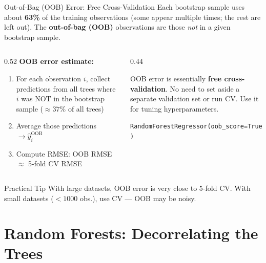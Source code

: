 \documentclass[aspectratio=169, 11pt]{beamer}
\begin{document}
\begin{frame}{Out-of-Bag (OOB) Error: Free Cross-Validation}
  Each bootstrap sample uses about \textbf{63\%} of the training observations
  (some appear multiple times; the rest are left out).
  The \textbf{out-of-bag (OOB)} observations are those \emph{not} in a given bootstrap sample.
  \begin{columns}[T]
    \begin{column}{0.52\textwidth}
      \textbf{OOB error estimate:}
      \begin{enumerate}\small
        \item For each observation $i$, collect predictions from
              all trees where $i$ was NOT in the bootstrap sample
              ($\approx 37\%$ of all trees)
        \item Average those predictions $\to \hat{y}_i^{\text{OOB}}$
        \item Compute RMSE: OOB RMSE $\approx$ 5-fold CV RMSE
      \end{enumerate}
    \end{column}
    \begin{column}{0.44\textwidth}
      \begin{keybox}
        OOB error is essentially \textbf{free cross-validation}.
        No need to set aside a separate validation set or run CV.
        Use it for tuning hyperparameters.

        {\footnotesize\texttt{RandomForestRegressor(oob\_score=True)}}
      \end{keybox}
    \end{column}
  \end{columns}
  \vspace{0.2cm}
  \begin{examplebox}{Practical Tip}
    With large datasets, OOB error is very close to 5-fold CV.
    With small datasets ($< 1000$ obs.), use CV --- OOB may be noisy.
  \end{examplebox}
\end{frame}

\section{Random Forests: Decorrelating the Trees}
\end{document}
